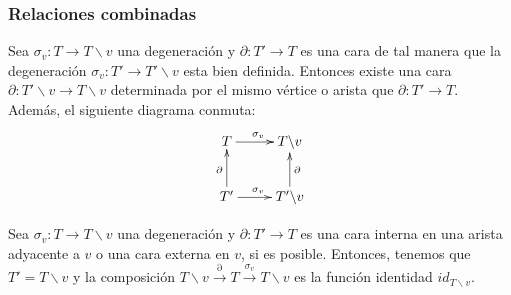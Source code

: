 \documentclass[11pt,a4paper,openright,oneside]{article}
\numberwithin{equation}{section}
\theoremstyle{definition}
\begin{document}
\subsubsection*{Relaciones combinadas}
Sea $\sigma_v\colon T\to T\backslash v$ una degeneraci\'on y $\partial\colon T' \to T$ es una cara de tal manera que la degeneraci\'on $\sigma_v\colon T'\to T'\backslash v$ esta bien definida. Entonces existe una cara $\partial\colon T'\backslash v \to T\backslash v$ determinada por el mismo v\'ertice o arista que $\partial\colon T' \to T$.
Adem\'as, el siguiente diagrama conmuta:
$$
    \xymatrix{
        T  \ar[r]^{\sigma_v}
        &T\backslash v \\
        T' \ar[u]^{\partial} \ar[r]^{\sigma_v}
        &T'\backslash v \ar[u]_{\partial}
    }
$$

Sea $\sigma_v\colon T\to T\backslash v$ una degeneraci\'on y $\partial\colon T' \to T$ es una cara interna en una arista adyacente a $v$ o una cara externa en $v$, si es posible. Entonces, tenemos que $T'=T\backslash v$ y la composici\'on
$    T\backslash v \overset{\partial}{\longrightarrow} T \overset{\sigma_v}{\longrightarrow} T\backslash v$ es la funci\'on identidad $id_{T\backslash v}$.
\end{document}
